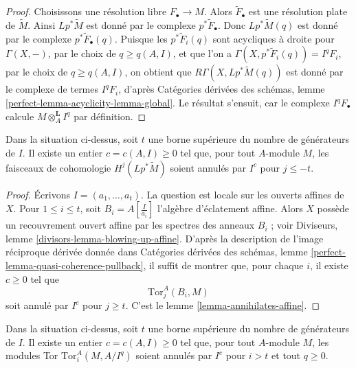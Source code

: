 \begin{proof}
Choisissons une résolution libre $F_\bullet \to M$. Alors $\widetilde{F}_\bullet$ est une résolution plate de $\widetilde{M}$. Ainsi $Lp^*\widetilde{M}$ est donné par le complexe $p^*\widetilde{F}_\bullet$. Donc $Lp^*\widetilde{M}(q)$ est donné par le complexe $p^*\widetilde{F}_\bullet(q)$. Puisque les $p^*\widetilde{F}_i(q)$ sont acycliques à droite pour $\Gamma(X, -)$, par le choix de $q \geq q(A, I)$, et que l'on a $\Gamma(X, p^*\widetilde{F}_i(q)) = I^qF_i$, par le choix de $q \geq q(A, I)$, on obtient que $R\Gamma(X, Lp^*\widetilde{M}(q))$ est donné par le complexe de termes $I^qF_i$, d'après Catégories dérivées des schémas, lemme \ref{perfect-lemma-acyclicity-lemma-global}. Le résultat s'ensuit, car le complexe $I^qF_\bullet$ calcule $M \otimes_A^\mathbf{L} I^q$ par définition.
\end{proof}

\begin{lemma}
\label{lemma-annihilates}
Dans la situation ci-dessus, soit $t$ une borne supérieure du nombre de générateurs de $I$. Il existe un entier $c = c(A, I) \geq 0$ tel que, pour tout $A$-module $M$, les faisceaux de cohomologie $H^j(Lp^*\widetilde{M})$ soient annulés par $I^c$ pour $j \leq -t$.
\end{lemma}

\begin{proof}
Écrivons $I = (a_1, \ldots, a_t)$. La question est locale sur les ouverts affines de $X$. Pour $1 \leq i \leq t$, soit $B_i = A[\frac{I}{a_i}]$ l'algèbre d'éclatement affine. Alors $X$ possède un recouvrement ouvert affine par les spectres des anneaux $B_i$ ; voir Diviseurs, lemme \ref{divisors-lemma-blowing-up-affine}. D'après la description de l'image réciproque dérivée donnée dans Catégories dérivées des schémas, lemme \ref{perfect-lemma-quasi-coherence-pullback}, il suffit de montrer que, pour chaque $i$, il existe $c \geq 0$ tel que
$$
\text{Tor}_j^A(B_i, M)
$$
soit annulé par $I^c$ pour $j \geq t$. C'est le lemme \ref{lemma-annihilates-affine}.
\end{proof}

\begin{lemma}
\label{lemma-annihilates-tors}
Dans la situation ci-dessus, soit $t$ une borne supérieure du nombre de générateurs de $I$. Il existe un entier $c = c(A, I) \geq 0$ tel que, pour tout $A$-module $M$, les modules Tor $\text{Tor}_i^A(M, A/I^q)$ soient annulés par $I^c$ pour $i > t$ et tout $q \geq 0$.
\end{lemma}

